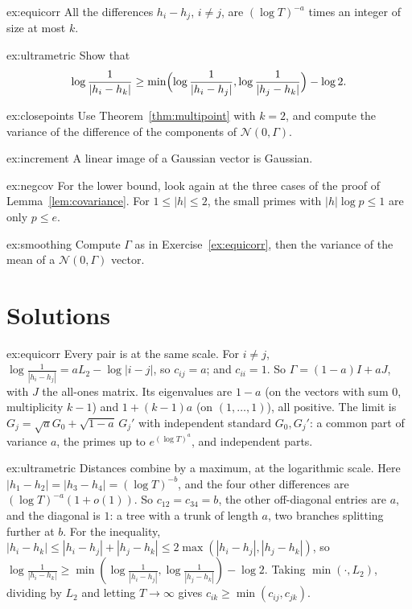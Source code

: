 \begin{hint}{ex:equicorr}
All the differences $h_i-h_j$, $i\ne j$, are $(\log T)^{-a}$ times an integer of size at most $k$.
\end{hint}

\begin{hint}{ex:ultrametric}
Show that
\[
\log\frac1{|h_i-h_k|}\ge\min\Bigl(\log\frac1{|h_i-h_j|},\log\frac1{|h_j-h_k|}\Bigr)-\log2.
\]
\end{hint}

\begin{hint}{ex:closepoints}
Use Theorem~\ref{thm:multipoint} with $k=2$, and compute the variance of the difference of the components of $\mathcal N(0,\Gamma)$.
\end{hint}

\begin{hint}{ex:increment}
A linear image of a Gaussian vector is Gaussian.
\end{hint}

\begin{hint}{ex:negcov}
For the lower bound, look again at the three cases of the proof of Lemma~\ref{lem:covariance}. For $1\le|h|\le2$, the small primes with $|h|\log p\le1$ are only $p\le e$.
\end{hint}

\begin{hint}{ex:smoothing}
Compute $\Gamma$ as in Exercise~\ref{ex:equicorr}, then the variance of the mean of a $\mathcal N(0,\Gamma)$ vector.
\end{hint}

\section{Solutions}

\begin{solution}{ex:equicorr}
\idea Every pair is at the same scale.
\writeup For $i\ne j$, $\log\frac1{|h_i-h_j|}=aL_2-\log|i-j|$, so $c_{ij}=a$; and $c_{ii}=1$. So $\Gamma=(1-a)I+aJ$, with $J$ the all-ones matrix. Its eigenvalues are $1-a$ (on the vectors with sum $0$, multiplicity $k-1$) and $1+(k-1)a$ (on $(1,\dots,1)$), all positive. The limit is $G_j=\sqrt aG_0+\sqrt{1-a}\,G_j'$ with independent standard $G_0,G_j'$: a common part of variance $a$, the primes up to $e^{(\log T)^a}$, and independent parts.
\end{solution}

\begin{solution}{ex:ultrametric}
\idea Distances combine by a maximum, at the logarithmic scale.
\writeup Here $|h_1-h_2|=|h_3-h_4|=(\log T)^{-b}$, and the four other differences are $(\log T)^{-a}(1+o(1))$. So $c_{12}=c_{34}=b$, the other off-diagonal entries are $a$, and the diagonal is $1$: a tree with a trunk of length $a$, two branches splitting further at $b$. For the inequality, $|h_i-h_k|\le|h_i-h_j|+|h_j-h_k|\le2\max(|h_i-h_j|,|h_j-h_k|)$, so $\log\frac1{|h_i-h_k|}\ge\min(\log\frac1{|h_i-h_j|},\log\frac1{|h_j-h_k|})-\log2$. Taking $\min(\cdot,L_2)$, dividing by $L_2$ and letting $T\to\infty$ gives $c_{ik}\ge\min(c_{ij},c_{jk})$.
\end{solution}

